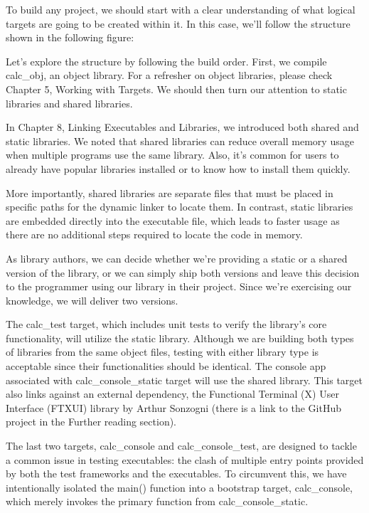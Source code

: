 
To build any project, we should start with a clear understanding of what logical targets are going to be created within it. In this case, we’ll follow the structure shown in the following figure:


Let’s explore the structure by following the build order. First, we compile calc\_obj, an object library. For a refresher on object libraries, please check Chapter 5, Working with Targets. We should then turn our attention to static libraries and shared libraries.


In Chapter 8, Linking Executables and Libraries, we introduced both shared and static libraries. We noted that shared libraries can reduce overall memory usage when multiple programs use the same library. Also, it’s common for users to already have popular libraries installed or to know how to install them quickly.

More importantly, shared libraries are separate files that must be placed in specific paths for the dynamic linker to locate them. In contrast, static libraries are embedded directly into the executable file, which leads to faster usage as there are no additional steps required to locate the code in memory.

As library authors, we can decide whether we’re providing a static or a shared version of the library, or we can simply ship both versions and leave this decision to the programmer using our library in their project. Since we’re exercising our knowledge, we will deliver two versions.

The calc\_test target, which includes unit tests to verify the library’s core functionality, will utilize the static library. Although we are building both types of libraries from the same object files, testing with either library type is acceptable since their functionalities should be identical. The console app associated with calc\_console\_static target will use the shared library. This target also links against an external dependency, the Functional Terminal (X) User Interface (FTXUI) library by Arthur Sonzogni (there is a link to the GitHub project in the Further reading section).

The last two targets, calc\_console and calc\_console\_test, are designed to tackle a common issue in testing executables: the clash of multiple entry points provided by both the test frameworks and the executables. To circumvent this, we have intentionally isolated the main() function into a bootstrap target, calc\_console, which merely invokes the primary function from calc\_console\_static.

